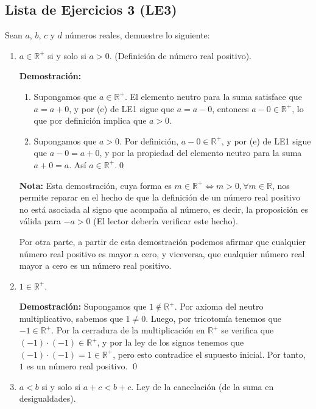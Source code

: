 \documentclass[11pt]{article}
\newcommand{\R}{\mathbb{R}}
\begin{document}
\subsection*{Lista de Ejercicios 3 (LE3)}
Sean $a$, $b$, $c$ y $d$ números reales, demuestre lo siguiente:
\begin{enumerate}[label=\alph*)]
    \item $a \in \R^+$ si y solo si $a>0$. (Definición de número real positivo).
    
    \textbf{Demostración:} \begin{enumerate}[label=\roman*)]
        \item Supongamos que $a \in \R^+$. El elemento neutro para la suma satisface que $a=a+0$, y por (e) de LE1 sigue que $a=a-0$, entonces $a-0 \in \R^+$, lo que por definición implica que $a>0$.
        \item Supongamos que $a>0$. Por definición, $a-0 \in \R^+$, y por (e) de LE1 sigue que $a-0=a+0$, y por la propiedad del elemento neutro para la suma $a+0=a$. Así $a \in \R^+$.\qed
    \end{enumerate}
    
    \textbf{Nota:} Esta demostración, cuya forma es $m\in \R^+ \iff m>0, \forall m\in \R$, nos permite reparar en el hecho de que la definición de un número real positivo no está asociada al signo que acompaña al número, es decir, la proposición es válida para $-a>0$ (El lector debería verificar este hecho).

    Por otra parte, a partir de esta demostración podemos afirmar que cualquier número real positivo es mayor a cero, y viceversa, que cualquier número real mayor a cero es un número real positivo.

    \item $1 \in \R^+$.
    
    \textbf{Demostración:} Supongamos que $1 \notin \R^+$. Por axioma del neutro multiplicativo, sabemos que $1\neq 0$. Luego, por tricotomía tenemos que $-1 \in \R^+$. Por la cerradura de la multiplicación en $\R^+$ se verifica que $(-1) \cdot (-1) \in \R^+$, y por la ley de los signos tenemos que $(-1) \cdot (-1) = 1 \in \R^+$, pero esto contradice el supuesto inicial. Por tanto, $1$ es un número real positivo. \qed

    \item $a<b$ si y solo si $a+c<b+c$. Ley de la cancelación (de la suma en desigualdades).
    

\end{enumerate}
\end{document}
